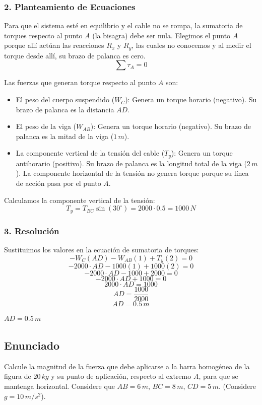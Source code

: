 \documentclass[12pt, a4paper]{article}
\begin{document}
\subsubsection*{2. Planteamiento de Ecuaciones}
Para que el sistema esté en equilibrio y el cable no se rompa, la sumatoria de torques respecto al punto $A$ (la bisagra) debe ser nula. Elegimos el punto $A$ porque allí actúan las reacciones $R_x$ y $R_y$, las cuales no conocemos y al medir el torque desde allí, su brazo de palanca es cero.
$$\sum \tau_A = 0$$

Las fuerzas que generan torque respecto al punto $A$ son:
\begin{itemize}
    \item El peso del cuerpo suspendido ($W_C$): Genera un torque horario (negativo). Su brazo de palanca es la distancia $AD$.
    \item El peso de la viga ($W_{AB}$): Genera un torque horario (negativo). Su brazo de palanca es la mitad de la viga ($1 \, \si{m}$).
    \item La componente vertical de la tensión del cable ($T_y$): Genera un torque antihorario (positivo). Su brazo de palanca es la longitud total de la viga ($2 \, \si{m}$). La componente horizontal de la tensión no genera torque porque su línea de acción pasa por el punto $A$.
\end{itemize}

Calculamos la componente vertical de la tensión:
$$T_y = T_{BC} \sin(30^\circ) = 2000 \cdot 0.5 = 1000 \, \si{N}$$

\subsubsection*{3. Resolución}
Sustituimos los valores en la ecuación de sumatoria de torques:
$$- W_C (AD) - W_{AB} (1) + T_y (2) = 0$$
$$- 2000 \cdot AD - 1000 (1) + 1000 (2) = 0$$
$$- 2000 \cdot AD - 1000 + 2000 = 0$$
$$- 2000 \cdot AD + 1000 = 0$$
$$2000 \cdot AD = 1000$$
$$AD = \frac{1000}{2000}$$
$$AD = 0.5 \, \si{m}$$

\begin{tcolorbox}[colback=green!5!white, colframe=green!50!black, title=Respuesta Final]
\centering \Large $AD = 0.5 \, \si{m}$
\end{tcolorbox}

\newpage

\subsection*{Enunciado}
Calcule la magnitud de la fuerza que debe aplicarse a la barra homogénea de la figura de $20 \, \si{kg}$ y su punto de aplicación, respecto al extremo $A$, para que se mantenga horizontal. Considere que $AB = 6 \, \si{m}$, $BC = 8 \, \si{m}$, $CD = 5 \, \si{m}$. (Considere $g = 10 \, \si{m/s^2}$).
\end{document}
